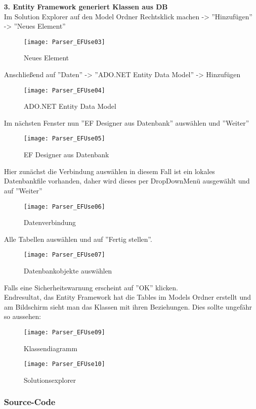 \break \textbf{3. Entity Framework generiert Klassen aus DB} \\
Im Solution Explorer auf den Model Ordner Rechtsklick machen -> ''Hinzufügen'' -> ''Neues Element''
\begin{figure}[H]
    \centering
    \texttt{[image: Parser\_EFUse03]}
    \caption{Neues Element}
    \label{fig:parsef03}
\end{figure} 
Anschließend auf ''Daten'' -> ''ADO.NET Entity Data Model'' -> Hinzufügen
\begin{figure}[H]
    \centering
    \texttt{[image: Parser\_EFUse04]}
    \caption{ADO.NET Entity Data Model}
    \label{fig:parsef04}
\end{figure} 
Im nächsten Fenster nun  ''EF Designer aus Datenbank'' auswählen und ''Weiter''
\begin{figure}[H]
    \centering
    \texttt{[image: Parser\_EFUse05]}
    \caption{EF Designer aus Datenbank}
    \label{fig:parsef05}
\end{figure} 
Hier zunächst die Verbindung auswählen in diesem Fall ist ein lokales Datenbankfile vorhanden, daher wird dieses per DropDownMenü ausgewählt und auf ''Weiter''
\begin{figure}[H]
    \centering
    \texttt{[image: Parser\_EFUse06]}
    \caption{Datenverbindung}
    \label{fig:parsef06}
\end{figure} 
Alle Tabellen auswählen und auf ''Fertig stellen''. 
\begin{figure}[H]
    \centering
    \texttt{[image: Parser\_EFUse07]}
    \caption{Datenbankobjekte auswählen}
    \label{fig:parsef07}
\end{figure} 
Falls eine Sicherheitswarnung erscheint auf ''OK'' klicken. \\
Endresultat, das Entity Framework hat die Tables im Models Ordner erstellt und am Bildschirm sieht man das Klassen mit ihren Beziehungen. Dies sollte ungefähr so aussehen:
\begin{figure}[H]
    \centering
    \texttt{[image: Parser\_EFUse09]}
    \caption{Klassendiagramm}
    \label{fig:parsef07}
\end{figure} 
\begin{figure}[H]
    \centering
    \texttt{[image: Parser\_EFUse10]}
    \caption{Solutionsexplorer}
    \label{fig:parsef07}
\end{figure} 



\subsubsection{Source-Code}
